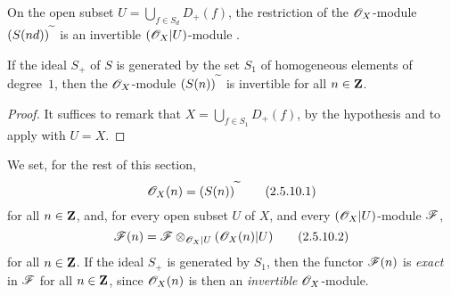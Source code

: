 \begin{corollary}[2.5.8]
\label{II.2.5.8}
On the open subset $U=\bigcup_{f\in S_d}D_+(f)$, the restriction of the $\mathscr{O}_X$-module $(S(nd))^{\,\widetilde{\,}\,}$ is an invertible $(\mathscr{O}_X|U)$-module .
\end{corollary}

\begin{corollary}[2.5.9]
\label{II.2.5.9}
If the ideal $S_+$ of $S$ is generated by the set $S_1$ of homogeneous elements of degree~$1$, then the $\mathscr{O}_X$-module $(S(n))^{\,\widetilde{\,}\,}$ is invertible for all $n\in\mathbf{Z}$.
\end{corollary}

\begin{proof}
It suffices to remark that $X=\bigcup_{f\in S_1}D_+(f)$, by the hypothesis  and to apply  with $U=X$.
\end{proof}

\begin{env}[2.5.10]
\label{II.2.5.10}
We set, for the rest of this section,
\[
\label{II.2.5.10.1}
  \mathscr{O}_X(n) = (S(n))^{\,\widetilde{\,}\,}
\tag{2.5.10.1}
\]
for all $n\in\mathbf{Z}$, and, for every open subset $U$ of $X$, and every $(\mathscr{O}_X|U)$-module $\mathscr{F}$,
\[
\label{II.2.5.10.2}
  \mathscr{F}(n) = \mathscr{F}\otimes_{\mathscr{O}_X|U}(\mathscr{O}_X(n)|U)
\tag{2.5.10.2}
\]
for all $n\in\mathbf{Z}$.
If the ideal $S_+$ is generated by $S_1$, then the functor $\mathscr{F}(n)$ is \emph{exact} in $\mathscr{F}$ for all $n\in\mathbf{Z}$, since $\mathscr{O}_X(n)$ is then an \emph{invertible} $\mathscr{O}_X$-module.
\end{env}

